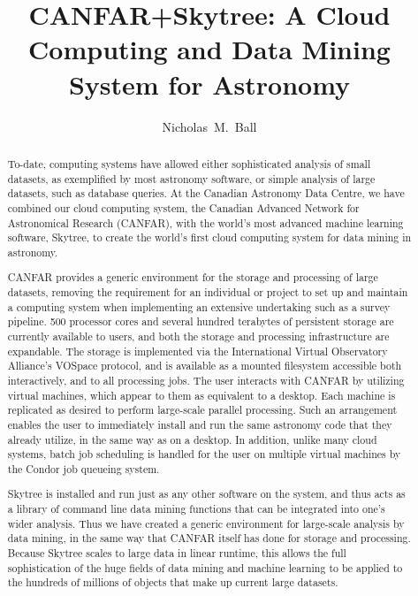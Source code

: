 
\resetcounters




\title{CANFAR+Skytree: A Cloud Computing and Data Mining System for Astronomy}
\author{Nicholas~M.~Ball
}


\begin{abstract}
To-date, computing systems have allowed either sophisticated analysis of small datasets, as exemplified by most astronomy software, or simple analysis of large datasets, such as database queries. At the Canadian Astronomy Data Centre, we have combined our cloud computing system, the Canadian Advanced Network for Astronomical Research (CANFAR), with the world's most advanced machine learning software, Skytree, to create the world's first cloud computing system for data mining in astronomy.

CANFAR provides a generic environment for the storage and processing of large datasets, removing the requirement for an individual or project to set up and maintain a computing system when implementing an extensive undertaking such as a survey pipeline. 500 processor cores and several hundred terabytes of persistent storage are currently available to users, and both the storage and processing infrastructure are expandable. The storage is implemented via the International Virtual Observatory Alliance's VOSpace protocol, and is available as a mounted filesystem accessible both interactively, and to all processing jobs. The user interacts with CANFAR by utilizing virtual machines, which appear to them as equivalent to a desktop. Each machine is replicated as desired to perform large-scale parallel processing. Such an arrangement enables the user to immediately install and run the same astronomy code that they already utilize, in the same way as on a desktop. In addition, unlike many cloud systems, batch job scheduling is handled for the user on multiple virtual machines by the Condor job queueing system.

Skytree is installed and run just as any other software on the system, and thus acts as a library of command line data mining functions that can be integrated into one's wider analysis. Thus we have created a generic environment for large-scale analysis by data mining, in the same way that CANFAR itself has done for storage and processing. Because Skytree scales to large data in linear runtime, this allows the full sophistication of the huge fields of data mining and machine learning to be applied to the hundreds of millions of objects that make up current large datasets.


\end{abstract}
